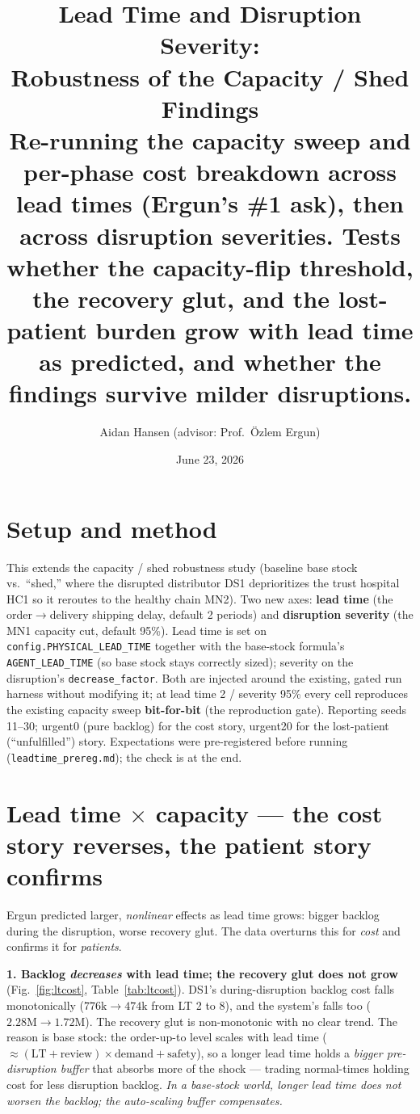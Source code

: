 \documentclass[11pt]{article}
\title{\textbf{Lead Time and Disruption Severity:\\
Robustness of the Capacity / Shed Findings}\\
\normalsize Re-running the capacity sweep and per-phase cost breakdown across lead times
(Ergun's \#1 ask), then across disruption severities. Tests whether the capacity-flip threshold,
the recovery glut, and the lost-patient burden grow with lead time as predicted, and whether the
findings survive milder disruptions.}
\author{Aidan Hansen \quad (advisor: Prof.\ \"Ozlem Ergun)}
\date{June 23, 2026}
\begin{document}
\maketitle

\section*{Setup and method}

This extends the capacity / shed robustness study (baseline base stock vs.\ ``shed,'' where the
disrupted distributor DS1 deprioritizes the trust hospital HC1 so it reroutes to the healthy
chain MN2). Two new axes: \textbf{lead time} (the order$\to$delivery shipping delay, default 2
periods) and \textbf{disruption severity} (the MN1 capacity cut, default 95\%). Lead time is set
on \texttt{config.PHYSICAL\_LEAD\_TIME} together with the base-stock formula's
\texttt{AGENT\_LEAD\_TIME} (so base stock stays correctly sized); severity on the disruption's
\texttt{decrease\_factor}. Both are injected around the existing, gated run harness without
modifying it; at lead time 2 / severity 95\% every cell reproduces the existing capacity sweep
\textbf{bit-for-bit} (the reproduction gate). Reporting seeds 11--30; urgent0 (pure backlog) for
the cost story, urgent20 for the lost-patient (``unfulfilled'') story. Expectations were
pre-registered before running (\texttt{leadtime\_prereg.md}); the check is at the end.

\section{Lead time $\times$ capacity --- the cost story reverses, the patient story confirms}

Ergun predicted larger, \emph{nonlinear} effects as lead time grows: bigger backlog during the
disruption, worse recovery glut. The data overturns this for \emph{cost} and confirms it for
\emph{patients}.

\textbf{1. Backlog \emph{decreases} with lead time; the recovery glut does not grow}
(Fig.~\ref{fig:ltcost}, Table~\ref{tab:ltcost}). DS1's during-disruption backlog cost falls
monotonically ($776\mathrm{k}\to474\mathrm{k}$ from LT 2 to 8), and the system's falls too
($2.28\mathrm{M}\to1.72\mathrm{M}$). The recovery glut is non-monotonic with no clear trend. The
reason is base stock: the order-up-to level scales with lead time
($\approx(\text{LT}+\text{review})\times\text{demand}+\text{safety}$), so a longer lead time
holds a \emph{bigger pre-disruption buffer} that absorbs more of the shock --- trading
normal-times holding cost for less disruption backlog. \emph{In a base-stock world, longer lead
time does not worsen the backlog; the auto-scaling buffer compensates.}
\end{document}
